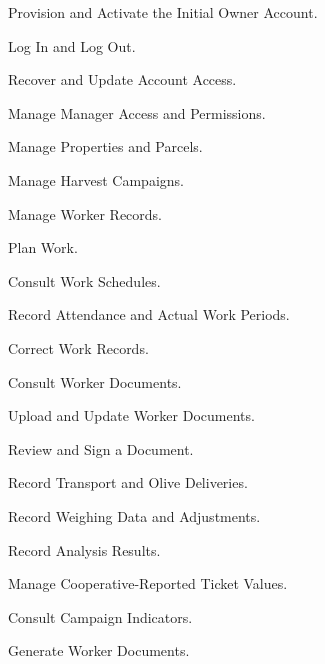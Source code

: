 \begin{description}

    \item[] Provision and Activate the Initial Owner Account.
    \item[] Log In and Log Out.
    \item[] Recover and Update Account Access.
    \item[] Manage Manager Access and Permissions.
    \item[] Manage Properties and Parcels.
    \item[] Manage Harvest Campaigns.
    \item[] Manage Worker Records.
    \item[] Plan Work.
    \item[] Consult Work Schedules.
    \item[] Record Attendance and Actual Work Periods.
    \item[] Correct Work Records.
    \item[] Consult Worker Documents.
    \item[] Upload and Update Worker Documents.
    \item[] Review and Sign a Document.
    \item[] Record Transport and Olive Deliveries.
    \item[] Record Weighing Data and Adjustments.
    \item[] Record Analysis Results.
    \item[] Manage Cooperative-Reported Ticket Values.
    \item[] Consult Campaign Indicators.
    \item[] Generate Worker Documents.
\end{description}





















